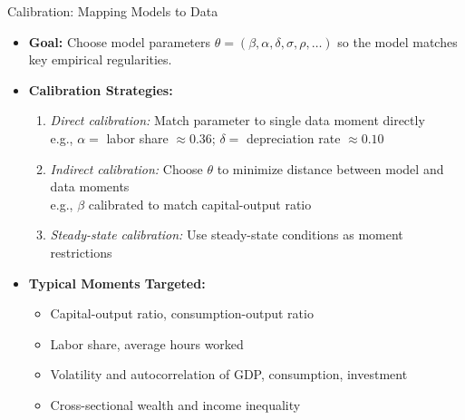 \documentclass[10pt,english,aspectratio=169]{beamer}
\begin{document}
\begin{frame}{Calibration: Mapping Models to Data}
\begin{itemize}
\item \textbf{Goal:} Choose model parameters $\theta = (\beta, \alpha, \delta, \sigma, \rho, \ldots)$ so the model matches key empirical regularities.

\medskip
\item \textbf{Calibration Strategies:}
\begin{enumerate}
    \item \emph{Direct calibration:} Match parameter to single data moment directly\\
        \quad e.g., $\alpha = $ labor share $\approx 0.36$; $\delta = $ depreciation rate $\approx 0.10$
    \item \emph{Indirect calibration:} Choose $\theta$ to minimize distance between model and data moments\\
        \quad e.g., $\beta$ calibrated to match capital-output ratio
    \item \emph{Steady-state calibration:} Use steady-state conditions as moment restrictions
\end{enumerate}

\medskip
\item \textbf{Typical Moments Targeted:}
\begin{itemize}
    \item Capital-output ratio, consumption-output ratio
    \item Labor share, average hours worked
    \item Volatility and autocorrelation of GDP, consumption, investment
    \item Cross-sectional wealth and income inequality
\end{itemize}
\end{itemize}
\end{frame}
\end{document}

